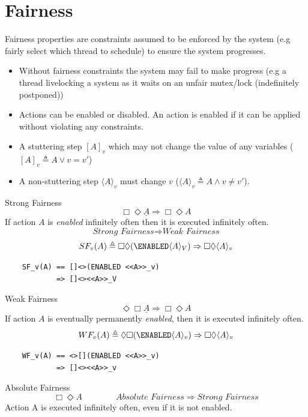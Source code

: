 \section{Fairness}
Fairness properties are constraints assumed to be enforced by the system (e.g fairly select which thread to schedule) to ensure the system progresses.
\begin{itemize}
    \item Without fairness constraints the system may fail to make progress (e.g a thread livelocking a system as it waits on an unfair mutex/lock (indefinitely postponed))
    \item Actions can be enabled or disabled. An action is enabled if it can be applied without violating any constraints.
    \item A stuttering step $[A]_v$ which may not change the value of any variables ($[A]_v \triangleq A \lor v = v'$)
    \item A non-stuttering step $\langle A \rangle_v$ must change $v$ ($\langle A \rangle_v \triangleq A \land v \neq v'$).
\end{itemize}
\begin{tcbraster}[raster columns=2,raster equal height]
    \begin{definitionbox}{Strong Fairness}
        \[\Box \Diamond \underline{A} \Rightarrow \Box \Diamond A\]
        If action $A$ is \textit{enabled} infinitely often then it is executed infinitely often.
        \[\textit{Strong Fairness} \Rightarrow \textit{Weak Fairness}\]
        \[SF_v(A) \triangleq \Box \Diamond (\ENABLED \langle A \rangle _V) \Rightarrow \Box \Diamond \langle A \rangle_v\]    
        \begin{verbatim}
    SF_v(A) == []<>(ENABLED <<A>>_v) 
            => []<><<A>>_V
        \end{verbatim}
    \end{definitionbox}
    \begin{definitionbox}{Weak Fairness}
        \[\Diamond \Box \underline{A} \Rightarrow \Box \Diamond A\]
        If action $A$ is eventually permanently \textit{enabled}, then it is executed infinitely often.
        \[\]
        \[WF_v(A) \triangleq \Diamond \Box (\ENABLED \langle A \rangle_v) \Rightarrow \Box \Diamond \langle A \rangle_v\]
        \begin{verbatim}
    WF_v(A) == <>[](ENABLED <<A>>_v) 
            => []<><<A>>_v
        \end{verbatim}
    \end{definitionbox}
\end{tcbraster}
\begin{definitionbox}{Absolute Fairness}
    \[\Box\Diamond A \qquad \qquad \textit{Absolute Fairness} \Rightarrow \textit{Strong Fairness}\]
    Action A is executed infinitely often, even if it is not enabled.
\end{definitionbox}

